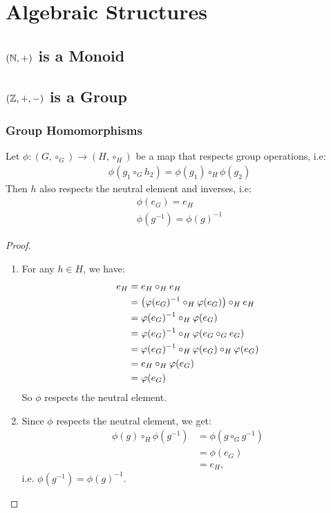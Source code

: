 \part{Algebraic Structures}
\parttoc
\chapter{$(\mathbb{N}, +)$ is a Monoid}
\chapter{$(\mathbb{Z}, +, -)$ is a Group}
\section{Group Homomorphisms}
\begin{theorem}
	Let $\phi : (G, \circ_G) \to (H, \circ_H)$ be a map that respects group operations, i.e:
	\begin{align*}
		\phi(g_1 \circ_G h_2) = \phi(g_1) \circ_H \phi(g_2)
	\end{align*}
	Then $h$ also respects the neutral element and inverses, i.e:
	\begin{align*}
		\phi(e_G) = e_H\\
		\phi(g^{-1}) = \phi(g)^{-1}
	\end{align*}
\end{theorem}
\begin{proof}
	\begin{enumerate}
		\item For any $h \in H$, we have:
		\begin{align*}
			e_H 
			&= e_H \circ_H e_H\\
			&= \qty(\varphi(e_G)^{-1} \circ_H \varphi(e_G)) \circ_H e_H\\
			&= \varphi(e_G)^{-1} \circ_H \varphi(e_G)\\
			&= \varphi(e_G)^{-1} \circ_H \varphi(e_G \circ_G e_G)\\
			&= \varphi(e_G)^{-1} \circ_H \varphi(e_G) \circ_H \varphi(e_G)\\
			&= e_H \circ_H \varphi(e_G)\\
			&= \varphi(e_G)
		\end{align*}	
		So $\phi$ respects the neutral element.
		\item Since $\phi$ respects the neutral element, we get:
		\begin{align*}
			\phi(g) \circ_H \phi(g^{-1})
			&=
			\phi(g \circ_G g^{-1})\\
			&=
			\phi(e_G)\\
			&=
			e_H,
		\end{align*}
		i.e. $\phi(g^{-1}) = \phi(g)^{-1}$.
	\end{enumerate}
\end{proof}

